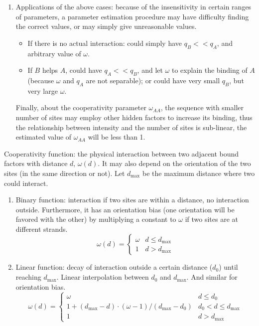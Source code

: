 \documentclass[11pt]{article}
\begin{document}
\begin{enumerate}
\begin{enumerate}
\item Applications of the above cases: because of the insensitivity in certain ranges of parameters, a parameter estimation procedure may have difficulty finding the correct values, or may simply give unreasonable values. 
\begin{itemize}
\item If there is no actual interaction: could simply have $q_B << q_A$, and arbitrary value of $\omega$. 
\item If $B$ helps $A$, could have $q_A << q_B$, and let $\omega$ to explain the binding of $A$ (because $\omega$ and $q_A$ are not separable); or could have very small $q_B$, but very large $\omega$. 
\end{itemize}
Finally, about the cooperativity parameter $\omega_{AA}$, the sequence with smaller number of sites may employ other hidden factors to increase its binding, thus the relationship between intensity and the number of sites is sub-linear, the estimated value of $\omega_{AA}$ will be less than 1. 

\end{enumerate}

Cooperativity function: the physical interaction between two adjacent bound factors with distance $d$, $\omega(d)$. It may also depend on the orientation of the two sites (in the same direction or not). Let $d_{\max}$ be the maximum distance where two could interact. 

\begin{enumerate}

\item Binary function: interaction if two sites are within a distance, no interaction outside. Furthermore, it has an orientation bias (one orientation will be favored with the other) by multiplying a constant to $\omega$ if two sites are at different strands. 
\begin{equation}
\omega(d) = \left\{ \begin{array}{ll}
\omega & d \leq d_{\max}\\
1 & d > d_{\max}
\end{array} \right.
\end{equation}

\item Linear function: decay of interaction outside a certain distance ($d_0$) until reaching $d_{\max}$. Linear interpolation between $d_0$ and $d_{\max}$. And similar for orientation bias. 
\begin{equation}
\omega(d) = \left\{ \begin{array}{ll}
\omega & d \leq d_0\\
1 + (d_{\max}-d) \cdot (\omega-1) / (d_{\max}-d_0)  & d_0 < d \leq d_{\max}\\
1 & d > d_{\max}
\end{array} \right.
\end{equation}


\end{enumerate}
\end{enumerate}
\end{document}
